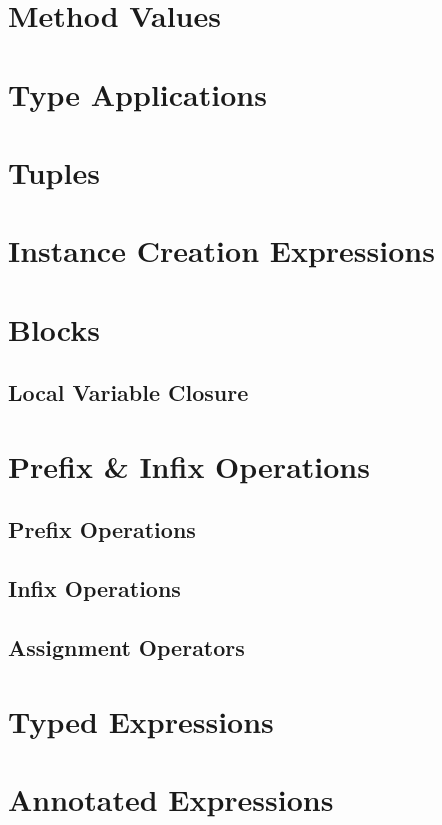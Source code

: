 \section{Method Values}

\section{Type Applications}

\section{Tuples}

\section{Instance Creation Expressions}

\section{Blocks}

\subsection{Local Variable Closure}
\label{sec:local-variable-closure}

\section{Prefix \& Infix Operations}

\subsection{Prefix Operations}

\subsection{Infix Operations}

\subsection{Assignment Operators}

\section{Typed Expressions}

\section{Annotated Expressions}
\label{sec:annotated-exprs}

